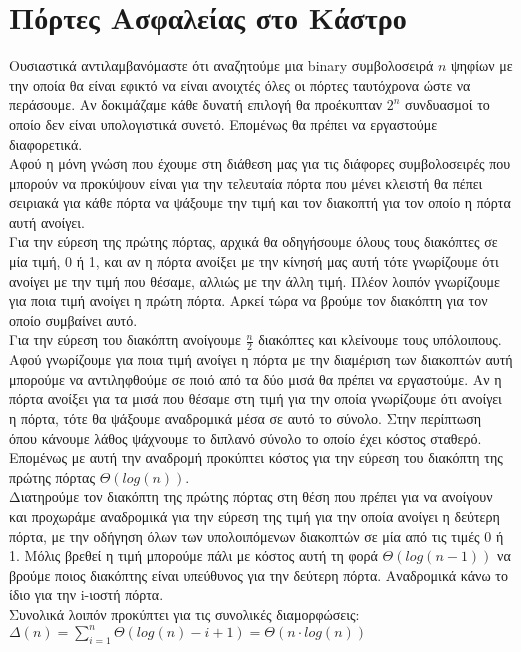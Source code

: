 \documentclass{article} \usepackage[greek,english]{babel}
\begin{document}
\pagebreak


\section{Πόρτες Ασφαλείας στο Κάστρο}
Ουσιαστικά αντιλαμβανόμαστε ότι αναζητούμε μια binary συμβολοσειρά $n$ ψηφίων με την οποία θα είναι
εφικτό να είναι ανοιχτές όλες οι πόρτες ταυτόχρονα ώστε να περάσουμε. Αν δοκιμάζαμε κάθε δυνατή επιλογή
θα προέκυπταν $2^n$ συνδυασμοί το οποίο δεν είναι υπολογιστικά συνετό. Επομένως θα πρέπει να εργαστούμε διαφορετικά.\\
Αφού η μόνη γνώση που έχουμε στη διάθεση μας για τις διάφορες συμβολοσειρές που μπορούν να προκύψουν είναι για την τελευταία πόρτα
που μένει κλειστή θα πέπει σειριακά για κάθε πόρτα να ψάξουμε την τιμή και τον διακοπτή για τον οποίο
η πόρτα αυτή ανοίγει. \\
Για την εύρεση της πρώτης πόρτας, αρχικά θα οδηγήσουμε όλους τους διακόπτες σε μία τιμή, 0 ή 1, και
αν η πόρτα ανοίξει με την κίνησή μας αυτή τότε γνωρίζουμε ότι ανοίγει με την τιμή που θέσαμε, αλλιώς
με την άλλη τιμή. Πλέον λοιπόν γνωρίζουμε για ποια τιμή ανοίγει η πρώτη πόρτα. Αρκεί τώρα να βρούμε τον
διακόπτη για τον οποίο συμβαίνει αυτό. \\
Για την εύρεση του διακόπτη ανοίγουμε $\frac{n}{2}$ διακόπτες και κλείνουμε τους υπόλοιπους. Αφού γνωρίζουμε
για ποια τιμή ανοίγει η πόρτα με την διαμέριση των διακοπτών αυτή μπορούμε να αντιληφθούμε σε ποιό 
από τα δύο μισά θα πρέπει να εργαστούμε. Αν η πόρτα ανοίξει για τα μισά που θέσαμε στη τιμή για την 
οποία γνωρίζουμε ότι ανοίγει η πόρτα, τότε θα ψάξουμε αναδρομικά μέσα σε αυτό το σύνολο. Στην περίπτωση
όπου κάνουμε λάθος ψάχνουμε το διπλανό σύνολο το οποίο έχει κόστος σταθερό. Επομένως με αυτή την αναδρομή
προκύπτει κόστος για την εύρεση του διακόπτη της πρώτης πόρτας $\Theta(log(n))$. \\
Διατηρούμε τον διακόπτη της πρώτης πόρτας στη θέση που πρέπει για να ανοίγουν και προχωράμε αναδρομικά 
για την εύρεση της τιμή για την οποία ανοίγει η δεύτερη πόρτα, με την οδήγηση όλων των υπολοιπόμενων διακοπτών
σε μία από τις τιμές 0 ή 1. Μόλις βρεθεί η τιμή μπορούμε πάλι με κόστος αυτή τη φορά $\Theta(log(n-1))$
να βρούμε ποιος διακόπτης είναι υπεύθυνος για την δεύτερη πόρτα. Αναδρομικά κάνω το ίδιο για την i-ιοστή πόρτα. \\ \break
Συνολικά λοιπόν προκύπτει για τις συνολικές διαμορφώσεις: $\Delta(n) = \sum_{i=1}^{n}\Theta(log(n)-i+1)
= \Theta(n\cdot log(n))$
\end{document}
